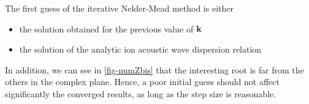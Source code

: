     The first guess of the iterative Nelder-Mead method is either 
    \begin{itemize}
      \item the solution obtained for the previous value of ${\mathbf k}$
      \item the solution of the analytic ion acoustic wave dispersion relation
    \end{itemize}
    In addition, we can see in \cref{fig-numZbis} that the interesting root is far from the others in the complex plane.
    Hence, a poor initial guess should not affect significantly the converged results, as long as the step size is reasonable.
    